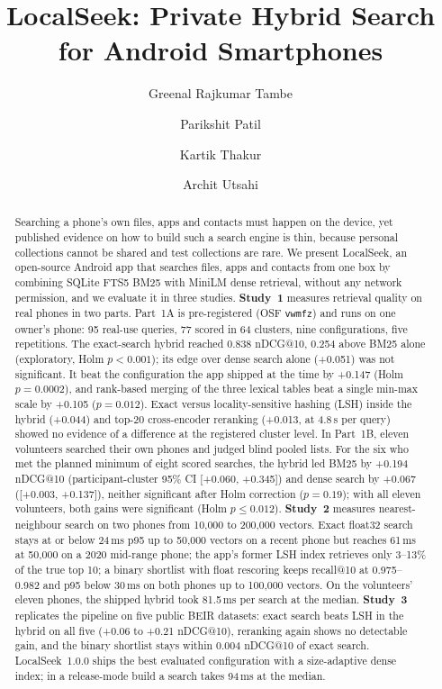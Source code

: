 \documentclass[11pt,a4paper]{article}
\title{LocalSeek: Private Hybrid Search for Android Smartphones}
\author[1]{Greenal Rajkumar Tambe}
\author[1]{Parikshit Patil}
\author[1]{Kartik Thakur}
\author[1]{Archit Utsahi}
\affil[1]{Sardar Patel Institute of Technology, Mumbai, India}
\date{}
\makeatletter
\newcommand{\ndcg}{nDCG@10}
\makeatother
\begin{document}
\maketitle

\begin{abstract}
Searching a phone's own files, apps and contacts must happen on the device, yet published evidence on how to build such a search engine is thin, because personal collections cannot be shared and test collections are rare. We present LocalSeek, an open-source Android app that searches files, apps and contacts from one box by combining SQLite FTS5 BM25 with MiniLM dense retrieval, without any network permission, and we evaluate it in three studies.
\textbf{Study~1} measures retrieval quality on real phones in two parts. Part~1A is pre-registered (OSF \texttt{vwmfz}) and runs on one owner's phone: 95 real-use queries, 77 scored in 64 clusters, nine configurations, five repetitions. The exact-search hybrid reached 0.838 \ndcg{}, 0.254 above BM25 alone (exploratory, Holm $p<0.001$); its edge over dense search alone (+0.051) was not significant. It beat the configuration the app shipped at the time by +0.147 (Holm $p=0.0002$), and rank-based merging of the three lexical tables beat a single min-max scale by +0.105 ($p=0.012$). Exact versus locality-sensitive hashing (LSH) inside the hybrid (+0.044) and top-20 cross-encoder reranking (+0.013, at 4.8\,s per query) showed no evidence of a difference at the registered cluster level. In Part~1B, eleven volunteers searched their own phones and judged blind pooled lists. For the six who met the planned minimum of eight scored searches, the hybrid led BM25 by +0.194 \ndcg{} (participant-cluster 95\% CI [+0.060, +0.345]) and dense search by +0.067 ([+0.003, +0.137]), neither significant after Holm correction ($p=0.19$); with all eleven volunteers, both gains were significant (Holm $p \le 0.012$).
\textbf{Study~2} measures nearest-neighbour search on two phones from 10,000 to 200,000 vectors. Exact float32 search stays at or below 24\,ms p95 up to 50,000 vectors on a recent phone but reaches 61\,ms at 50,000 on a 2020 mid-range phone; the app's former LSH index retrieves only 3--13\% of the true top 10; a binary shortlist with float rescoring keeps recall@10 at 0.975--0.982 and p95 below 30\,ms on both phones up to 100,000 vectors. On the volunteers' eleven phones, the shipped hybrid took 81.5\,ms per search at the median.
\textbf{Study~3} replicates the pipeline on five public BEIR datasets: exact search beats LSH in the hybrid on all five (+0.06 to +0.21 \ndcg{}), reranking again shows no detectable gain, and the binary shortlist stays within 0.004 \ndcg{} of exact search.
LocalSeek~1.0.0 ships the best evaluated configuration with a size-adaptive dense index; in a release-mode build a search takes 94\,ms at the median.
\end{abstract}
\end{document}
